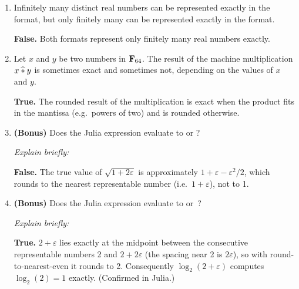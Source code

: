 \documentclass[a4paper]{article}
\newcommand{\answer}[1]{%
    \ifdefined\showsolutions
        \par\smallskip
        {\small\color{blue!60!black}#1\par}
    \fi
}
\begin{document}
\begin{enumerate}
    \item
        Infinitely many distinct real numbers can be represented exactly in the~
        format, but only finitely many can be represented exactly in the  format.
        \answer{\textbf{False.}
        Both formats represent only finitely many real numbers exactly.}

    \item
        Let $x$ and $y$ be two numbers in $\mathbf F_{64}$.
        The result of the machine multiplication $x \mathbin{\widehat *} y$ is sometimes exact and sometimes not,
        depending on the values of $x$ and $y$.
        \answer{\textbf{True.}
        The rounded result of the multiplication is exact when the product
        fits in the mantissa (e.g.\ powers of two) and is rounded otherwise.}

    \item
        \textbf{(Bonus)}
        Does the Julia expression  evaluate to 
        or ?

        \textit{Explain briefly:}
        \ifdefined\showsolutions\else\vspace{1.5cm}\fi
        \answer{\textbf{False.}
        The true value of $\sqrt{1 + 2\varepsilon}$ is approximately
        $1 + \varepsilon - \varepsilon^2/2$, which rounds to the nearest
        representable number \julia{1 + eps()} (i.e.\ $1 + \varepsilon$),
        not to 1.}

    \item
        \textbf{(Bonus)}
        Does the Julia expression  evaluate to 
        or~?

        \textit{Explain briefly:}
        \ifdefined\showsolutions\else\vspace{1.5cm}\fi
        \answer{\textbf{True.}
        $2 + \varepsilon$ lies exactly at the midpoint between the
        consecutive representable numbers 2 and $2 + 2\varepsilon$
        (the spacing near 2 is $2\varepsilon$), so with round-to-nearest-even
        it rounds to 2. Consequently
        $\log_2(2 + \varepsilon)$ computes $\log_2(2) = 1$ exactly.
        (Confirmed in Julia.)}
\end{enumerate}
\end{document}
